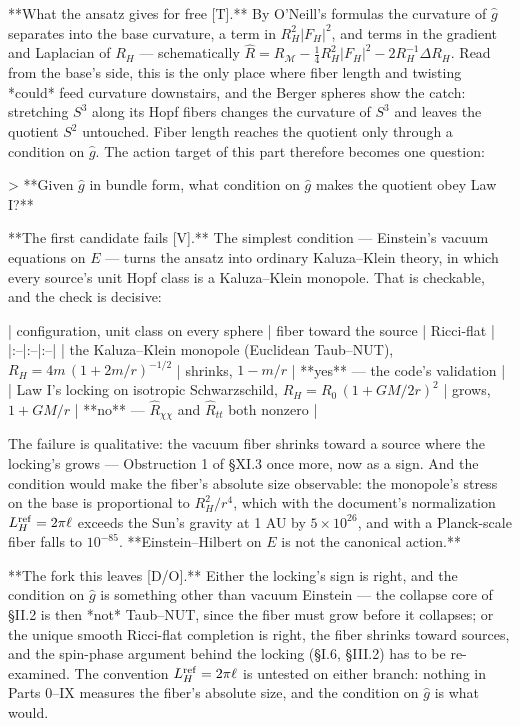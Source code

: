 **What the ansatz gives for free [T].** By O'Neill's formulas the curvature of $\hat g$ separates into the base curvature, a term in $R_H^2|F_H|^2$, and terms in the gradient and Laplacian of $R_H$ — schematically $\hat R = R_{\mathcal M}-\tfrac14R_H^2|F_H|^2-2R_H^{-1}\Delta R_H$. Read from the base's side, this is the only place where fiber length and twisting *could* feed curvature downstairs, and the Berger spheres show the catch: stretching $S^3$ along its Hopf fibers changes the curvature of $S^3$ and leaves the quotient $S^2$ untouched. Fiber length reaches the quotient only through a condition on $\hat g$. The action target of this part therefore becomes one question:

> **Given $\hat g$ in bundle form, what condition on $\hat g$ makes the quotient obey Law I?**

**The first candidate fails [V].** The simplest condition — Einstein's vacuum equations on $E$ — turns the ansatz into ordinary Kaluza–Klein theory, in which every source's unit Hopf class is a Kaluza–Klein monopole. That is checkable, and the check is decisive:

| configuration, unit class on every sphere | fiber toward the source | Ricci-flat |
|:--|:--|:--|
| the Kaluza–Klein monopole (Euclidean Taub–NUT), $R_H = 4m\,(1+2m/r)^{-1/2}$ | shrinks, $1-m/r$ | **yes** — the code's validation |
| Law I's locking on isotropic Schwarzschild, $R_H = R_0\,(1+GM/2r)^2$ | grows, $1+GM/r$ | **no** — $\hat R_{\chi\chi}$ and $\hat R_{tt}$ both nonzero |

The failure is qualitative: the vacuum fiber shrinks toward a source where the locking's grows — Obstruction 1 of §XI.3 once more, now as a sign. And the condition would make the fiber's absolute size observable: the monopole's stress on the base is proportional to $R_H^2/r^4$, which with the document's normalization $L_H^{\rm ref} = 2\pi\ell$ exceeds the Sun's gravity at 1 AU by $5\times10^{26}$, and with a Planck-scale fiber falls to $10^{-85}$. **Einstein–Hilbert on $E$ is not the canonical action.**

**The fork this leaves [D/O].** Either the locking's sign is right, and the condition on $\hat g$ is something other than vacuum Einstein — the collapse core of §II.2 is then *not* Taub–NUT, since the fiber must grow before it collapses; or the unique smooth Ricci-flat completion is right, the fiber shrinks toward sources, and the spin-phase argument behind the locking (§I.6, §III.2) has to be re-examined. The convention $L_H^{\rm ref} = 2\pi\ell$ is untested on either branch: nothing in Parts 0–IX measures the fiber's absolute size, and the condition on $\hat g$ is what would.

